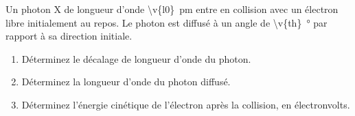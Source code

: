 Un photon X de longueur d'onde \qty{\v{l0}}{pm} entre en collision avec un électron libre initialement au repos. Le photon est diffusé à un angle de \qty{\v{th}}{\degree} par rapport à sa direction initiale.

\begin{enumerate}[label=\alph*)]
    \item Déterminez le décalage de longueur d'onde du photon.
    \item Déterminez la longueur d'onde du photon diffusé.
    \item Déterminez l'énergie cinétique de l'électron après la collision, en électronvolts.
\end{enumerate}
